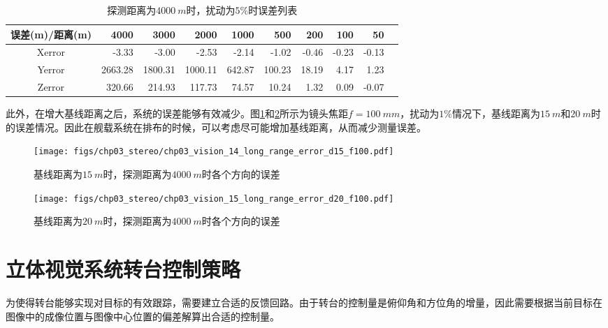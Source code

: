 \begin{table}[htb]
	\centering
	\caption{探测距离为$4000\ m$时，扰动为$5\%$时误差列表}
	\label{label:chp03_stereo_2}
	\begin{tabular}{crrrrrrrrr}
		\hline
		误差(m)/距离(m)     & 4000    & 3000    & 2000      & 1000  & 500    & 200   & 100   & 50    \\ \hline
		Xerror  & -3.33   & -3.00   & -2.53   & -2.14   & -1.02  & -0.46 & -0.23 & -0.13 \\ 
		Yerror & 2663.28 & 1800.31 & 1000.11 & 642.87  & 100.23 & 18.19 & 4.17  & 1.23  \\
		Zerror & 320.66  & 214.93  & 117.73  & 74.57   & 10.24  & 1.32  & 0.09  & -0.07 \\ \hline
		
	\end{tabular}
\end{table}

此外，在增大基线距离之后，系统的误差能够有效减少。图\ref{fig:chp03_vision_14_long_range_error_d15_f100}和\ref{fig:chp03_vision_15_long_range_error_d20_f100}所示为镜头焦距$f=100\ mm$，扰动为$1\%$情况下，基线距离为$15\ m$和$20\ m$时的误差情况。因此在舰载系统在排布的时候，可以考虑尽可能增加基线距离，从而减少测量误差。

\begin{figure}[htb]
	\centering
	\texttt{[image: figs/chp03\_stereo/chp03\_vision\_14\_long\_range\_error\_d15\_f100.pdf]}	
	\caption{基线距离为$15\ m$时，探测距离为$4000\ m$时各个方向的误差}
	\label{fig:chp03_vision_14_long_range_error_d15_f100}
\end{figure}

\begin{figure}[htb]
	\centering
	\texttt{[image: figs/chp03\_stereo/chp03\_vision\_15\_long\_range\_error\_d20\_f100.pdf]}	
	\caption{基线距离为$20\ m$时，探测距离为$4000\ m$时各个方向的误差}
	\label{fig:chp03_vision_15_long_range_error_d20_f100}
\end{figure}

\section{立体视觉系统转台控制策略}
为使得转台能够实现对目标的有效跟踪，需要建立合适的反馈回路。由于转台的控制量是俯仰角和方位角的增量，因此需要根据当前目标在图像中的成像位置与图像中心位置的偏差解算出合适的控制量。

